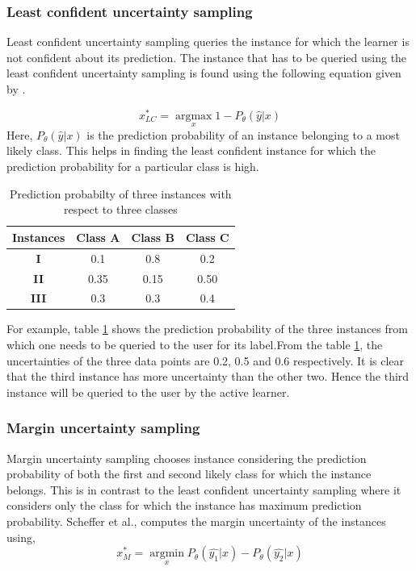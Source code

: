 \subsubsection{Least confident uncertainty sampling}

Least confident uncertainty sampling queries the instance for which the learner is not confident about its prediction. The instance that has to be queried using the least confident uncertainty sampling is found using the following equation given by \cite{lewis1994heterogeneous}. 

\begin{equation} 
x^{*}_{LC} = \operatorname*{argmax}_x  1 - P_{\theta}(\hat{y}|x) 
\end{equation}
Here,  $ P_{\theta}(\hat{y}|x) $ is the prediction probability of an instance belonging to a most likely class. This helps in finding the least confident instance for which the prediction probability for a particular class is high.
\begin{table}[htb!]
	\centering
\begin{tabular}{|c|c|c|c|}
	\hline
	\textbf{Instances} & \textbf{Class A} & \textbf{Class B} & \textbf{Class C} \\ \hline
	\textbf{I}         & 0.1              & 0.8              & 0.2              \\ \hline
	\textbf{II}        & 0.35             & 0.15             & 0.50             \\ \hline
	\textbf{III}       & 0.3              & 0.3              & 0.4              \\ \hline
\end{tabular}
	\caption{Prediction probabilty of three instances with respect to three classes}
	\label{least_confident}
\end{table}

For example, table \ref{least_confident} shows the prediction probability of the three instances from which one needs to be queried to the user for its label.From the table \ref{least_confident}, the uncertainties of the three data points are  0.2, 0.5 and 0.6 respectively. It is clear that the third instance has more uncertainty than the other two. Hence the third instance will be queried to the user by the active learner. \cite{Settles2010} \cite{modal_disagree}


\subsubsection{Margin uncertainty sampling}
Margin uncertainty sampling chooses instance considering the prediction probability of both the first and second likely class for which the instance belongs. This is in contrast to the least confident uncertainty sampling where it considers only the class for which the instance has maximum prediction probability. Scheffer et al.\cite{scheffer2001active}, computes the margin uncertainty of the instances using,
\begin{equation} 
 x^{*}_{M} = \operatorname*{argmin}_x P_{\theta}(\hat{y_{1}}|x) - P_{\theta}(\hat{y_{2}}|x)
 \end{equation} 

